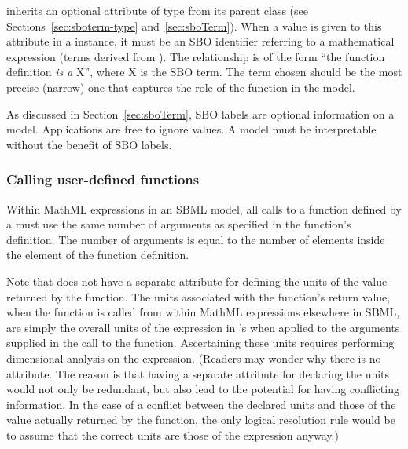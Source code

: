 \FunctionDefinition inherits an optional 
attribute of type  from its parent
class \SBase (see Sections~\ref{sec:sboterm-type}
and~\ref{sec:sboTerm}).  When a value is given to this
attribute in a \FunctionDefinition instance, it must be an
SBO identifier referring to a mathematical expression
(\ie terms derived from \sbomathformula).  The relationship is
of the form ``the function definition \emph{is a} X'', where X is
the SBO term.  The term chosen should be the most precise (narrow)
one that captures the role of the function in the model.

As discussed in Section~\ref{sec:sboTerm}, SBO labels are optional
information on a model.  Applications are free to ignore
 values.  A model must be interpretable without the
benefit of SBO labels.


\begin{blockChanged}

\subsubsection{Calling user-defined functions}
\label{sec:functiondefinition-calling}

Within MathML expressions in an SBML model, all calls to a
function defined by a \FunctionDefinition must use the same number
of arguments as specified in the function's definition.  The
number of arguments is equal to the number of 
elements inside the  element of the function
definition.

\end{blockChanged}

Note that \FunctionDefinition does not have a separate attribute
for defining the units of the value returned by the function.  The
units associated with the function's return value, when the
function is called from within MathML expressions elsewhere in
SBML, are simply the overall units of the expression in \FunctionDefinition's
 when applied to the arguments supplied in the call to
the function.  Ascertaining these units requires performing
dimensional analysis on the expression.  (Readers may wonder why
there is no attribute.  The reason is that having a separate
attribute for declaring the units would not only be redundant, but
also lead to the potential for having conflicting information.  In
the case of a conflict between the declared units and those of the
value actually returned by the function, the only logical
resolution rule would be to assume that the correct units are
those of the expression anyway.)



